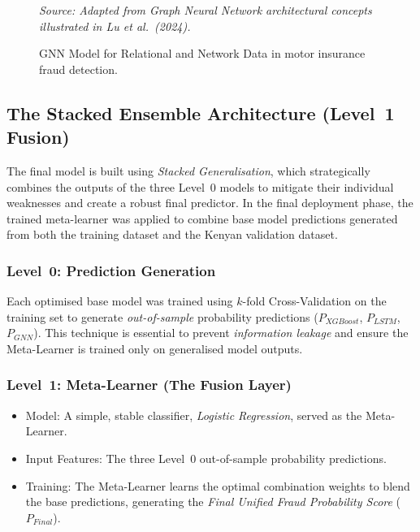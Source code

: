 \documentclass[12pt,a4paper,oneside]{report}
\numberwithin{equation}{chapter}
\begin{document}
\begin{figure}[H]
{
}
\caption{GNN Model for Relational and Network Data in motor insurance fraud detection.}
\label{fig:gnn_architecture}
\small\textit{Source: Adapted from Graph Neural Network architectural concepts illustrated in Lu et al.\ (2024).}
\end{figure}

\subsection{The Stacked Ensemble Architecture (Level~1 Fusion)}

The final model is built using \textit{Stacked Generalisation}, which strategically combines the
outputs of the three Level~0 models to mitigate their individual weaknesses and create a robust
final predictor. In the final deployment phase, the trained meta-learner was applied to combine
base model predictions generated from both the training dataset and the Kenyan validation dataset.

\subsubsection{Level~0: Prediction Generation}

Each optimised base model was trained using $k$-fold Cross-Validation on the training set to
generate \textit{out-of-sample} probability predictions ($P_{XGBoost}$, $P_{LSTM}$, $P_{GNN}$).
This technique is essential to prevent \textit{information leakage} and ensure the Meta-Learner
is trained only on generalised model outputs.

\subsubsection{Level~1: Meta-Learner (The Fusion Layer)}

\begin{itemize}
    \item Model: A simple, stable classifier, \textit{Logistic Regression}, served as the Meta-Learner.
    \item Input Features: The three Level~0 out-of-sample probability predictions.
    \item Training: The Meta-Learner learns the optimal combination weights to blend the base predictions, generating the \textit{Final Unified Fraud Probability Score} ($P_{Final}$).
\end{itemize}
\end{document}
